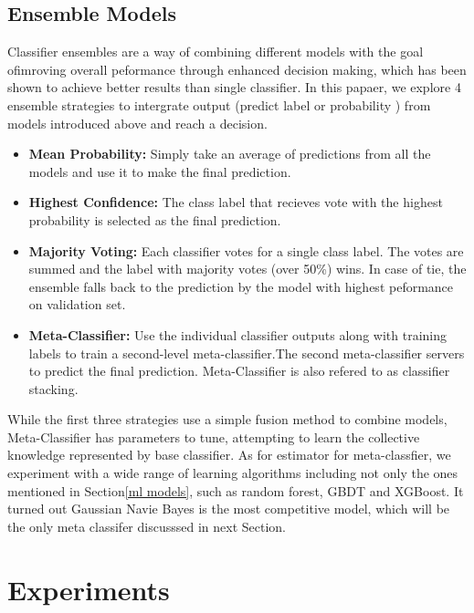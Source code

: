 \documentclass[11pt,a4paper]{article}
\begin{document}
\subsection{Ensemble Models\label{ensemble models}}
Classifier ensembles are a way of combining different models with the goal ofimroving overall peformance through enhanced decision making, which has been shown to achieve better results than single classifier. In this papaer, we explore 4 ensemble strategies to intergrate output (predict label or probability ) from models introduced above and reach a decision.
\begin{itemize}
	\item \textbf{Mean Probability:}  Simply take an average of predictions from all the models and use it to make the final prediction.
	\item \textbf{Highest Confidence:} The class label that recieves vote with the highest probability is selected as the final prediction.
	\item \textbf{Majority Voting:} Each classifier votes for a single class label. The votes are summed and the label with majority votes (over 50\%) wins. In case of tie, the ensemble falls back to the prediction by the model with highest peformance on validation set.
	\item \textbf{Meta-Classifier:} Use the individual classifier outputs along with training labels to train a second-level meta-classifier.The second meta-classifier servers to predict the final prediction. Meta-Classifier is also refered to as classifier stacking.
\end{itemize}
While the first three strategies use a simple fusion method to combine models, Meta-Classifier has parameters to tune, attempting to learn the collective knowledge represented by base classifier. As for estimator for meta-classfier, we experiment with a wide range of learning algorithms including not only the ones mentioned in Section\ref{ml models}, such as random forest, GBDT and XGBoost. It turned out Gaussian Navie Bayes is the most competitive model, which will be the only meta classifer discusssed in next Section.

\section{Experiments\label{experiments}}
\end{document}
